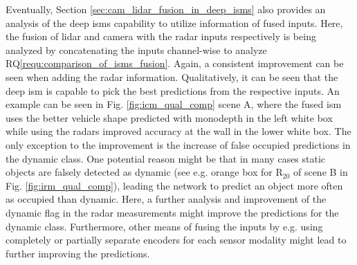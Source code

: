 Eventually, Section \ref{sec:cam_lidar_fusion_in_deep_isms} also provides an analysis of the deep \gls{ism}s capability to utilize information of fused inputs. Here, the fusion of lidar and camera with the radar inputs respectively is being analyzed by concatenating the inputs channel-wise to analyze RQ\ref{requ:comparison_of_isms_fusion}. Again, a consistent improvement can be seen when adding the radar information. Qualitatively, it can be seen that the deep \gls{ism} is capable to pick the best predictions from the respective inputs. An example can be seen in Fig. \ref{fig:icm_qual_comp} scene A, where the fused \gls{ism} uses the better vehicle shape predicted with \gls{monodepth} in the left white box while using the radars improved accuracy at the wall in the lower white box. The only exception to the improvement is the increase of false occupied predictions in the dynamic class. One potential reason might be that in many cases static objects are falsely detected as dynamic (see e.g. orange box for R$_{20}$ of scene B in Fig. \ref{fig:irm_qual_comp}), leading the network to predict an object more often as occupied than dynamic. Here, a further analysis and improvement of the dynamic flag in the radar measurements might improve the predictions for the dynamic class. Furthermore, other means of fusing the inputs by e.g. using completely or partially separate encoders for each sensor modality might lead to further improving the predictions.
%

